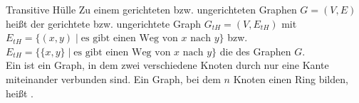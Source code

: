 \begin{Def}{Transitive Hülle}
    Zu einem gerichteten bzw. ungerichteten Graphen $G = (V, E)$ heißt der
    gerichtete bzw. ungerichtete Graph $G_{tH} = (V, E_{tH})$ mit \\
    $E_{tH} = \big\{(x, y) \;|\; \text{es gibt einen Weg von } x
    \text{ nach } y\big\}$ bzw. \\
    $E_{tH} = \big\{\{x, y\} \;|\; \text{es gibt einen Weg von } x
    \text{ nach } y\big\}$
    die  des Graphen $G$. \\
    Ein  ist ein Graph, in dem zwei verschiedene
    Knoten durch nur eine Kante miteinander verbunden sind.
    Ein Graph, bei dem $n$ Knoten einen Ring bilden, heißt .
\end{Def}
